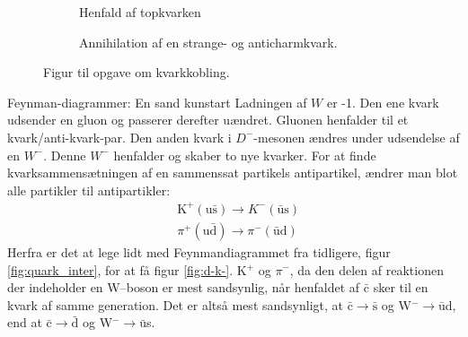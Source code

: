 \begin{figure} [h!]
    \centering
	\begin{subfigure}[t]{0.47\textwidth}
	    \centering
    \caption{Henfald af topkvarken}
    \label{fig:topkvark}
    \end{subfigure}
    \hfill
    \begin{subfigure}[t]{0.47\textwidth}
        \centering
        \caption{Annihilation af en strange- og anticharmkvark.}
        \label{fig:s_anti_c_annihilation}
        \end{subfigure}
        \caption{Figur til opgave om kvarkkobling.}
\end{figure}
    
\begin{opgave}{Feynman-diagrammer: En sand kunstart}
    \opg Ladningen af $W$ er -1.
    \opg Den ene kvark udsender en gluon og passerer derefter uændret. Gluonen henfalder til et kvark/anti-kvark-par. Den anden kvark i $D^-$-mesonen ændres under udsendelse af en $W^-$. Denne $W^-$ henfalder og skaber to nye kvarker.
    \opg For at finde kvarksammensætningen af en sammenssat partikels antipartikel, ændrer man blot alle partikler til antipartikler:
    \begin{align*}
        &\mathrm K^+(\mathrm u \bar{\mathrm{s}}) \rightarrow K^-(\bar{\mathrm{u}} \mathrm s) \\
        &\pi^+(\mathrm u \bar{\mathrm{d}}) \rightarrow \pi^-(\bar{\mathrm{u}} \mathrm d)
    \end{align*}
    Herfra er det at lege lidt med Feynmandiagrammet fra tidligere, figur \ref{fig:quark_inter}, for at få figur \ref{fig:d-k-}.
    \opg K$^+$ og $\pi^-$, da den delen af reaktionen der indeholder en W--boson er mest sandsynlig, når henfaldet af $\bar{\text{c}}$ sker til en kvark af samme generation. Det er altså mest sandsynligt, at $\bar{\mathrm c} \rightarrow \bar{\mathrm s}$ og W$^- \rightarrow \bar{\mathrm u}$d, end at $\bar{\mathrm c} \rightarrow \bar{\mathrm d}$ og W$^- \rightarrow \bar{\mathrm u}$s.
\end{opgave}

